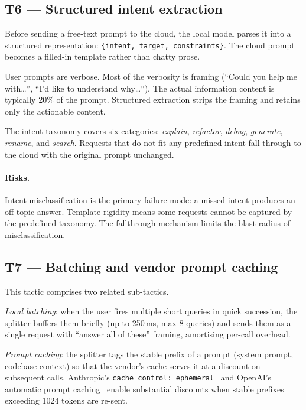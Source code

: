 \documentclass[11pt,a4paper]{article}
\begin{document}
\subsection{T6 --- Structured intent extraction}
\label{sec:t6}

Before sending a free-text prompt to the cloud, the local model parses
it into a structured representation: \texttt{\{intent, target,
constraints\}}. The cloud prompt becomes a filled-in template rather
than chatty prose.

User prompts are verbose. Most of the verbosity is framing (``Could you
help me with\ldots'', ``I'd like to understand why\ldots''). The actual
information content is typically 20\% of the prompt. Structured
extraction strips the framing and retains only the actionable content.

The intent taxonomy covers six categories: \emph{explain}, \emph{refactor},
\emph{debug}, \emph{generate}, \emph{rename}, and \emph{search}. Requests
that do not fit any predefined intent fall through to the cloud with the
original prompt unchanged.

\paragraph{Risks.}
Intent misclassification is the primary failure mode: a missed intent
produces an off-topic answer. Template rigidity means some requests
cannot be captured by the predefined taxonomy. The fallthrough mechanism
limits the blast radius of misclassification.

\subsection{T7 --- Batching and vendor prompt caching}
\label{sec:t7}

This tactic comprises two related sub-tactics.

\emph{Local batching}: when the user fires multiple short queries in
quick succession, the splitter buffers them briefly (up to 250\,ms, max
8 queries) and sends them as a single request with ``answer all of
these'' framing, amortising per-call overhead.

\emph{Prompt caching}: the splitter tags the stable prefix of a prompt
(system prompt, codebase context) so that the vendor's cache serves it
at a discount on subsequent calls. Anthropic's
\texttt{cache\_control:~ephemeral}~\cite{anthropic-cache} and OpenAI's
automatic prompt caching~\cite{openai-cache} enable substantial
discounts when stable prefixes exceeding 1024 tokens are re-sent.
\end{document}
